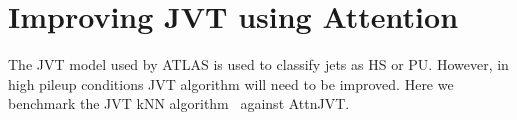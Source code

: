\section{Improving JVT using Attention}\hfill

The JVT model used by ATLAS is used to classify jets as HS or PU. However, in high pileup conditions JVT algorithm will need to be improved. Here we benchmark the JVT kNN algorithm~\cite{ATLAS-CONF-2014-018} against AttnJVT.




